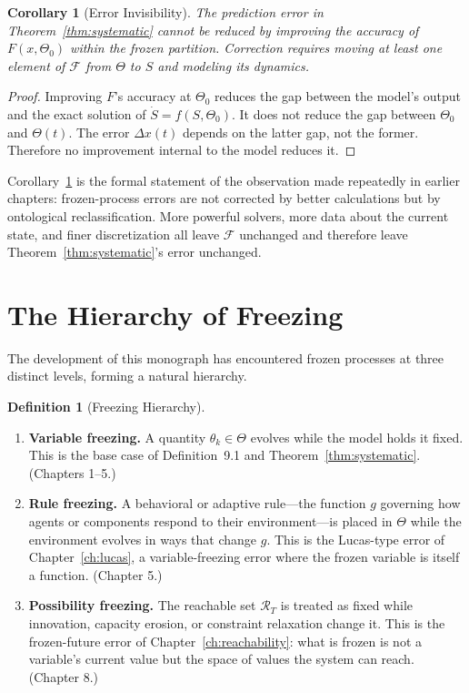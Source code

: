 \documentclass[11pt]{book}
\theoremstyle{plain}
\newtheorem{corollary}[theorem]{Corollary}
\theoremstyle{definition}
\newtheorem{definition}[theorem]{Definition}
\theoremstyle{remark}
\begin{document}
\begin{corollary}[Error Invisibility]
\label{cor:invisible}
The prediction error in Theorem~\ref{thm:systematic} cannot be reduced by improving the accuracy of $F(x, \Theta_0)$ within the frozen partition. Correction requires moving at least one element of $\mathcal{F}$ from $\Theta$ to $S$ and modeling its dynamics.
\end{corollary}
\begin{proof}
Improving $F$'s accuracy at $\Theta_0$ reduces the gap between the model's output and the exact solution of $\dot S = f(S, \Theta_0)$. It does not reduce the gap between $\Theta_0$ and $\Theta(t)$. The error $\Delta x(t)$ depends on the latter gap, not the former. Therefore no improvement internal to the model reduces it.
\end{proof}

Corollary~\ref{cor:invisible} is the formal statement of the observation made repeatedly in earlier chapters: frozen-process errors are not corrected by better calculations but by ontological reclassification. More powerful solvers, more data about the current state, and finer discretization all leave $\mathcal{F}$ unchanged and therefore leave Theorem~\ref{thm:systematic}'s error unchanged.

\section{The Hierarchy of Freezing}

The development of this monograph has encountered frozen processes at three distinct levels, forming a natural hierarchy.

\begin{definition}[Freezing Hierarchy]
\begin{enumerate}[label=\textbf{Level \arabic*.},itemsep=4pt]
\item \textbf{Variable freezing.} A quantity $\theta_k \in \Theta$ evolves while the model holds it fixed. This is the base case of Definition~9.1 and Theorem~\ref{thm:systematic}. (Chapters 1--5.)
\item \textbf{Rule freezing.} A behavioral or adaptive rule---the function $g$ governing how agents or components respond to their environment---is placed in $\Theta$ while the environment evolves in ways that change $g$. This is the Lucas-type error of Chapter~\ref{ch:lucas}, a variable-freezing error where the frozen variable is itself a function. (Chapter 5.)
\item \textbf{Possibility freezing.} The reachable set $\mathcal{R}_T$ is treated as fixed while innovation, capacity erosion, or constraint relaxation change it. This is the frozen-future error of Chapter~\ref{ch:reachability}: what is frozen is not a variable's current value but the space of values the system can reach. (Chapter 8.)
\end{enumerate}
\end{definition}
\end{document}
